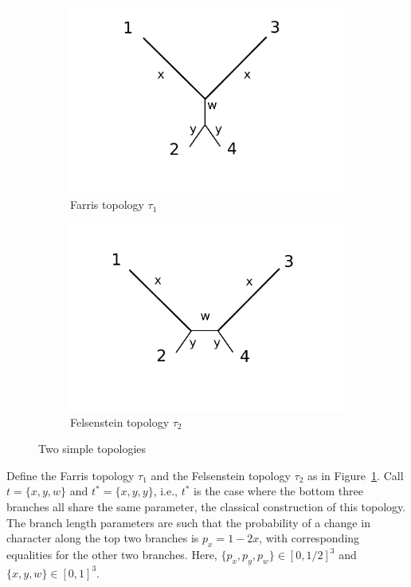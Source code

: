 \documentclass[a4paper]{article}
\begin{document}
\begin{figure}
\centering
\begin{subfigure}{.45\linewidth}
\centering
\includegraphics[width=.95\textwidth]{farris_blank}
\caption[short]{Farris topology $\tau_1$}
\end{subfigure}
\begin{subfigure}{.45\linewidth}
\centering
\includegraphics[width=.95\textwidth]{felsenstein_blank}
\caption[short]{Felsenstein topology $\tau_2$}
\end{subfigure}
\caption{Two simple topologies}
\label{fig:farris-fels-top}
\end{figure}

Define the Farris topology $\tau_1$ and the Felsenstein topology $\tau_2$ as in Figure~\ref{fig:farris-fels-top}.
Call $t=\{x,y,w\}$ and $t^*=\{x,y,y\}$, i.e., $t^*$ is the case where the bottom three branches all share the same parameter, the classical construction of this topology.
The branch length parameters are such that the probability of a change in character along the top two branches is $p_x=1-2x$, with corresponding equalities for the other two branches.
Here, $\{p_x,p_y,p_w\}\in[0,1/2]^3$ and $\{x,y,w\}\in[0,1]^3$.
\end{document}
